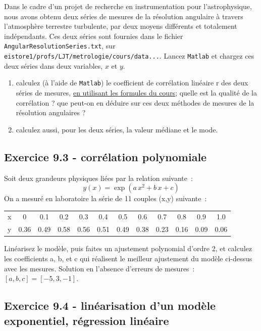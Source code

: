 Dans le cadre d'un projet de recherche en instrumentation pour l'astrophysique, nous avons obtenu deux séries de mesures de la résolution angulaire à travers l'atmosphère terrestre turbulente, par deux moyens différents et totalement indépendants. Ces deux séries sont fournies dans le fichier \texttt{AngularResolutionSeries.txt}, sur \newline
\texttt{eistore1/profs/LJT/metrologie/cours/data...}. Lancez \texttt{Matlab} et chargez ces deux séries dans deux variables, $x$ et $y$.
\begin{enumerate}
\item calculez (à l'aide de \texttt{Matlab}) le coefficient de corrélation linéaire r des deux séries de mesures, \underline{en utilisant les formules du cours}; quelle est la qualité de la corrélation ? que peut-on en déduire sur ces deux méthodes de mesures de la résolution angulaires ?
\item calculez aussi, pour les deux séries, la valeur médiane et le mode.
\end{enumerate}

\subsection*{Exercice 9.3 - corrélation polynomiale}

Soit deux grandeurs physiques liées par la relation suivante~:
$$
y(x)=\exp{(a\,x^2+b\,x+c)}
$$
On a mesuré en laboratoire la série de 11 couples (x,y) suivante~:
\begin{center}
\begin{tabular}{r|ccccccccccc}
x & 0 & 0.1 & 0.2 & 0.3 & 0.4 & 0.5 & 0.6 & 0.7 & 0.8 & 0.9 & 1.0\\
y & 0.36 & 0.49 & 0.58 & 0.56 & 0.51 & 0.49 & 0.38 & 0.23 & 0.16 & 0.09 & 0.06
\end{tabular}
\end{center}
Linéarisez le modèle, puis faites un ajustement polynomial d'ordre 2, et calculez les coefficients a, b, et c qui réalisent le meilleur ajustement du modèle ci-dessus avec les mesures. Solution en l'absence d'erreurs de mesures~: $[a,b,c]=[-5,3,-1]$.

\subsection*{Exercice 9.4 - linéarisation d'un modèle exponentiel, régression linéaire}

